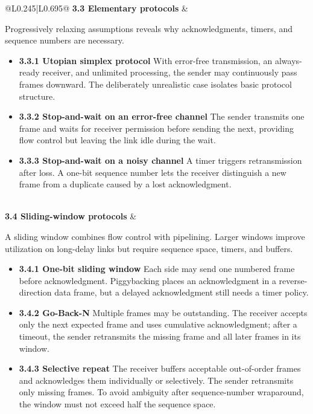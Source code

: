 \documentclass[10pt,letterpaper]{article}
\begin{document}
\begin{longtable}{@{}L{0.245\textwidth}|L{0.695\textwidth}@{}}
\textbf{3.3 Elementary protocols} & \begin{minipage}[t]{\linewidth}\raggedright Progressively relaxing assumptions reveals why acknowledgments, timers, and sequence numbers are necessary.\par\begin{itemize}\item \textbf{3.3.1 Utopian simplex protocol} With error-free transmission, an always-ready receiver, and unlimited processing, the sender may continuously pass frames downward. The deliberately unrealistic case isolates basic protocol structure.\item \textbf{3.3.2 Stop-and-wait on an error-free channel} The sender transmits one frame and waits for receiver permission before sending the next, providing flow control but leaving the link idle during the wait.\item \textbf{3.3.3 Stop-and-wait on a noisy channel} A timer triggers retransmission after loss. A one-bit sequence number lets the receiver distinguish a new frame from a duplicate caused by a lost acknowledgment.\end{itemize}\end{minipage} \\ \hline
{}\textbf{3.4 Sliding-window protocols} & \begin{minipage}[t]{\linewidth}\raggedright A sliding window combines flow control with pipelining. Larger windows improve utilization on long-delay links but require sequence space, timers, and buffers.\par\begin{itemize}\item \textbf{3.4.1 One-bit sliding window} Each side may send one numbered frame before acknowledgment. Piggybacking places an acknowledgment in a reverse-direction data frame, but a delayed acknowledgment still needs a timer policy.\item \textbf{3.4.2 Go-Back-N} Multiple frames may be outstanding. The receiver accepts only the next expected frame and uses cumulative acknowledgment; after a timeout, the sender retransmits the missing frame and all later frames in its window.\item \textbf{3.4.3 Selective repeat} The receiver buffers acceptable out-of-order frames and acknowledges them individually or selectively. The sender retransmits only missing frames. To avoid ambiguity after sequence-number wraparound, the window must not exceed half the sequence space.\end{itemize}\end{minipage} \\ \hline

\end{longtable}
\end{document}
